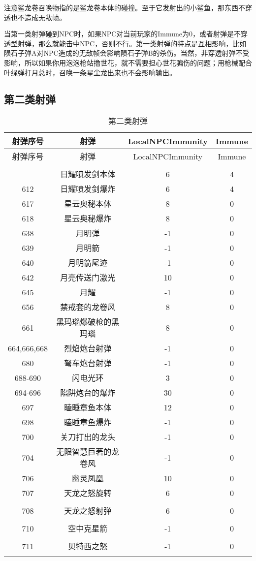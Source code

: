 注意鲨龙卷召唤物指的是鲨龙卷本体的碰撞。至于它发射出的小鲨鱼，那东西不穿透也不造成无敌帧。

当第一类射弹碰到NPC时，如果NPC对当前玩家的Immune为0，或者射弹是不穿透型射弹，那么就能击中NPC，否则不行。第一类射弹的特点是互相影响，比如陨石子弹A对NPC造成的无敌帧会影响陨石子弹B的杀伤。当然，非穿透射弹不受影响，所以如果你用泡泡枪站撸世花，就不需要担心世花骗伤的问题；用枪械配合叶绿弹打月总时，召唤一条星尘龙出来也不会影响输出。

\subsection{第二类射弹}

\begin{longtable}{|c|c|c|c|}
\caption{第二类射弹}\\ \hline
射弹序号 & 射弹 & LocalNPCImmunity & Immune\\\hline
\endfirsthead
\hline 射弹序号 & 射弹 & LocalNPCImmunity & Immune\\\hline
\endhead
\\\hline
\endfoot
611 & 日耀喷发剑本体 & 6 & 4 \\ \hline
612 & 日耀喷发剑爆炸 & 6 & 4 \\ \hline
617 & 星云奥秘本体 & 8 & 0 \\ \hline
618 & 星云奥秘爆炸 & 8 & 0 \\ \hline
638 & 月明弹 & -1 & 0 \\ \hline
639 & 月明箭 & -1 & 0 \\ \hline
640 & 月明箭尾迹 & -1 & 0 \\ \hline
642 & 月亮传送门激光 & 10 & 0 \\ \hline
645 & 月耀 & -1 & 0 \\ \hline
656 & 禁戒套的龙卷风 & 8 & 0 \\ \hline
661 & 黑玛瑙爆破枪的黑玛瑙 & 8 & 0 \\ \hline
664,666,668 & 烈焰炮台射弹 & -1 & 0 \\ \hline
680 & 弩车炮台射弹 & -1 & 0 \\ \hline
688-690 & 闪电光环 & 3 & 0 \\ \hline
694-696 & 陷阱炮台的爆炸 & 30 & 0 \\ \hline
697 & 瞌睡章鱼本体 & 12 & 0 \\ \hline
698 & 瞌睡章鱼爆炸 & -1 & 0 \\ \hline
700 & 关刀打出的龙头 & -1 & 0 \\ \hline
704 & 无限智慧巨著的龙卷风 & -1 & 0 \\ \hline
706 & 幽灵凤凰 & 10 & 0 \\ \hline
707 & 天龙之怒旋转 & 6 & 0 \\ \hline\\
708 & 天龙之怒射弹 & 6 & 0 \\ \hline\\
710 & 空中克星箭 & -1 & 0 \\ \hline\\
711 & 贝特西之怒 & -1 & 0 \\ \hline\\
\end{longtable}

